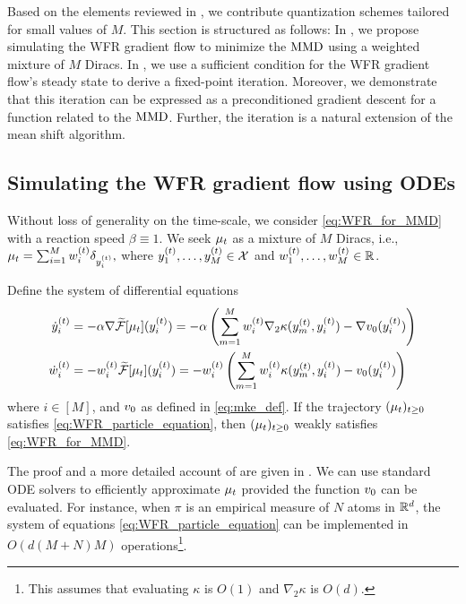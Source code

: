 


Based on the elements reviewed in , we contribute quantization schemes tailored for small values of $M$. This section is structured as follows: %
In , we propose simulating the WFR gradient flow to minimize the $\operatorname{MMD}$ using a weighted mixture of $M$ Diracs. In , we use a sufficient condition for the WFR gradient flow's steady state to derive a fixed-point iteration. 
Moreover, we demonstrate that this iteration can be expressed as a preconditioned gradient descent for a function related to the $\operatorname{MMD}$. Further, the iteration is a natural extension of the mean shift algorithm.


\subsection{Simulating the WFR gradient flow using ODEs}\label{sec:wfr}
Without loss of generality on the time-scale, we consider \eqref{eq:WFR_for_MMD} with a reaction speed $\beta\equiv 1.$
We seek $\mu_{t}$ as a mixture of $M$ Diracs, i.e.,
\(
    \mu_{t} = \sum_{i = 1}^{M} w_{i}^{(t)} \delta_{y_{i}^{(t)}},
\)
where $y_{1}^{(t)}, \dots, y_{M}^{(t)} \in \mathcal{X} $ and $w_{1}^{(t)}, \dots, w_M^{(t)} \in \mathbb{R}$. 


\begin{proposition}\label{prop:coupled_ode_WFR}
Define the system of differential equations
\begin{equation}\label{eq:WFR_particle_equation}
\begin{aligned}
    \dot{y}_{i}^{(t)} &= - \alpha\nabla\widetilde{\mathcal{F}}[\mu_t](y_{i}^{(t)}) =-\alpha\left(\sum\limits_{m = 1}^{M} w_{i}^{(t)} \nabla_2 \kappa(y_{m}^{(t)}, y_{i}^{(t)}) - \nabla v_{0}(y_{i}^{(t)})\right)  \\
     \dot{w}_{i}^{(t)} &= -  w_{i}^{(t)}\widetilde{\mathcal{F}}[\mu_{t}](y_{i}^{(t)}) =- w_{i}^{(t)} \left(\sum\limits_{m = 1}^{M} w_{i}^{(t)} \kappa(y_{m}^{(t)}, y_{i}^{(t)}) - v_{0}(y_{i}^{(t)}) \right)
\end{aligned}
\end{equation}
where $i \in [M]$, and  $v_{0}$ as defined in \eqref{eq:mke_def}.
If the trajectory $(\mu_{t})_{t \geq 0}$ satisfies \eqref{eq:WFR_particle_equation}, then $(\mu_{t})_{t \geq 0}$ weakly satisfies \eqref{eq:WFR_for_MMD}.
\end{proposition}


The proof and a more detailed account of  are given in .
We can use standard ODE solvers to efficiently approximate $\mu_{t}$ provided the function $v_{0}$ can be evaluated. For instance, when $\pi$ is an empirical measure of $N$ atoms in $\mathbb{R}^d$, the system of equations \eqref{eq:WFR_particle_equation} can be implemented in 
$O(d(M+N)M)$ operations\footnote{This assumes that evaluating $\kappa$ is $O(1)$ and $\nabla_2\kappa$ is $O(d)$.}.


